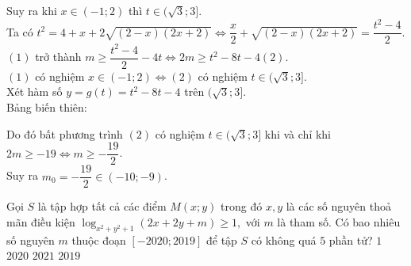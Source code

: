 \begin{ex}
{\begin{center}
		\end{center}
		Suy ra khi $x\in(-1;2)$ thì $t\in(\sqrt{3};3]$.\\
		Ta có $t^2=4+x+2\sqrt{(2-x)(2x+2)}\Leftrightarrow\dfrac{x}{2}+\sqrt{(2-x)(2x+2)}=\dfrac{t^2-4}{2}$.\\
		$(1)$ trở thành $m\geq\dfrac{t^2-4}{2}-4t\Leftrightarrow 2m\geq t^2-8t-4 (2)$.\\
		$(1)$ có nghiệm $x\in(-1;2)\Leftrightarrow(2)$ có nghiệm $t\in(\sqrt{3};3]$.\\
		Xét hàm số $y=g(t)=t^2-8t-4$ trên $(\sqrt{3};3]$.\\
		Bảng biến thiên: 
		\begin{center}		
		\end{center}
		Do đó bất phương trình $(2)$ có nghiệm $t\in(\sqrt{3};3]$ khi và chỉ khi $2m\geq-19\Leftrightarrow m\geq-\dfrac{19}{2}$.\\
		Suy ra $m_0=-\dfrac{19}{2}\in(-10;-9)$.
	}
\end{ex}
\begin{ex}
	Gọi $S$ là tập hợp tất cả các điểm $M(x;y)$ trong đó $x,y$ là các số nguyên thoả mãn điều kiện $\log_{x^2+y^2+1}(2x+2y+m)\geq 1,$ với $m$ là tham số. Có bao nhiêu số nguyên $m$ thuộc đoạn $[-2020;2019]$ để tập $S$ có không quá $5$ phần tử?
	\choice
	{$1$}
	{$2020$}
	{\True $2021$}
	{$2019$}
\end{ex}
